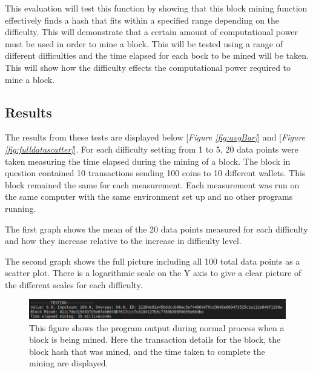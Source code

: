 \documentclass{l4proj}
\begin{document}
This evaluation will test this function by showing that this block mining function effectively finds a hash that fits 
within a specified range depending on the difficulty. This will demonstrate that a certain amount of computational
power must be used in order to mine a block. This will be tested using a range of different difficulties and the time
elapsed for each bock to be mined will be taken. This will show how the difficulty effects the computational power 
required to mine a block.



\subsection{Results}
The results from these tests are displayed below [\textit{Figure \ref{fig:avgBar}}] and [\textit{Figure \ref{fig:fulldatascatter}}]. For each 
difficulty setting from 1 to 5, 20 data points were taken measuring the time elapsed during the mining of
a block. The block in question contained 10 transactions sending 100 coins to 10 different wallets. This block
remained the same for each measurement. Each measurement was run on the same computer with the same environment
set up and no other programs running.

The first graph shows the mean of the 20 data points measured for each difficulty and how they increase relative
to the increase in difficulty level.

The second graph shows the full picture including all 100 total data points as a scatter plot. There is a logarithmic
scale on the Y axis to give a clear picture of the different scales for each difficulty.

\begin{figure}[!ht]
    \centering
    \includegraphics[width=1\linewidth]{images/check2.png}    
    \caption
    {
        This figure shows the program output during normal process when a block is being mined. Here the transaction
        details for the block, the block hash that was mined, and the time taken to complete the mining are displayed.
    }
    \label{fig:check2} 
\end{figure}
\end{document}

